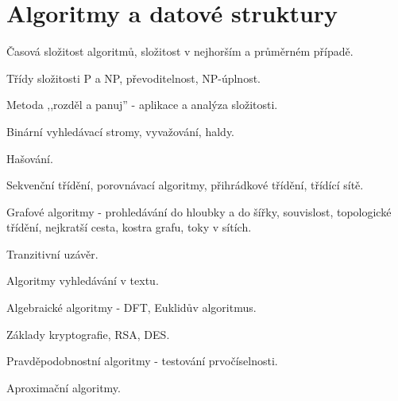 \section{Algoritmy a datové struktury}
\begin{pozadavky}
\begin{pitemize}
\item Časová složitost algoritmů, složitost v nejhorším a průměrném případě.
\item Třídy složitosti P a NP, převoditelnost, NP-úplnost.
\item Metoda ,,rozděl a panuj'' - aplikace a analýza složitosti.
\item Binární vyhledávací stromy, vyvažování, haldy.
\item Hašování.
\item Sekvenční třídění, porovnávací algoritmy, přihrádkové třídění, třídící sítě.
\item Grafové algoritmy - prohledávání do hloubky a do šířky, souvislost, topologické třídění, nejkratší cesta, kostra grafu, toky v sítích.
\item Tranzitivní uzávěr.
\item Algoritmy vyhledávání v textu.
\item Algebraické algoritmy - DFT, Euklidův algoritmus.
\item Základy kryptografie, RSA, DES.
\item Pravděpodobnostní algoritmy - testování prvočíselnosti.
\item Aproximační algoritmy.
\end{pitemize}
\end{pozadavky}














